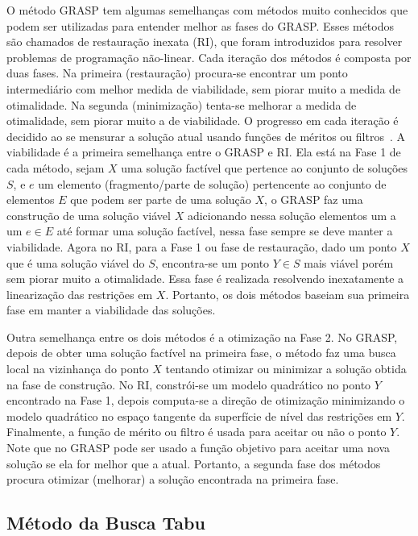 O método GRASP tem algumas semelhanças com métodos muito conhecidos que podem ser utilizadas para entender melhor as fases do GRASP. Esses métodos são chamados de restauração inexata (RI), que foram introduzidos para resolver problemas de programação não-linear. Cada iteração dos métodos é composta por duas fases. Na primeira (restauração) procura-se encontrar um ponto intermediário com melhor medida de viabilidade, sem piorar muito a medida de otimalidade. Na segunda (minimização) tenta-se melhorar a medida de otimalidade, sem piorar muito a de viabilidade. O progresso em cada iteração é decidido ao se mensurar a solução atual usando funções de méritos ou filtros~\citep{martinez2000inexact}. A viabilidade é a primeira semelhança entre o GRASP e RI. Ela está na Fase 1 de cada método, sejam $X$ uma solução factível que pertence ao conjunto de soluções $S$, e $e$ um elemento (fragmento/parte de solução) pertencente ao conjunto de elementos $E$ que podem ser parte de uma solução $X$, o GRASP faz uma construção de uma solução viável $X$ adicionando nessa solução elementos um a um $e \in E$ até formar uma solução factível, nessa fase sempre se deve manter a viabilidade. Agora no RI, para a Fase 1 ou fase de restauração, dado um ponto $X$ que é uma solução viável do $S$, encontra-se um ponto $Y \in S$ mais viável porém sem piorar muito a otimalidade. Essa fase é realizada resolvendo inexatamente a linearização das restrições em $X$. Portanto, os dois métodos baseiam sua primeira fase em manter a viabilidade das soluções. 

Outra semelhança entre os dois métodos é a otimização na Fase 2. No GRASP, depois de obter uma solução factível na primeira fase, o método faz uma busca local na vizinhança do ponto $X$ tentando otimizar ou minimizar a solução obtida na fase de construção. No RI, constrói-se um modelo quadrático no ponto $Y$ encontrado na Fase 1, depois computa-se a direção de otimização minimizando o modelo quadrático no espaço tangente da superfície de nível das restrições em $Y$. Finalmente, a função de mérito ou filtro é usada para aceitar ou não o ponto $Y$. Note que no GRASP pode ser usado a função objetivo para aceitar uma nova solução se ela for melhor que a atual. Portanto, a segunda fase dos métodos procura otimizar (melhorar) a solução encontrada na primeira fase. 

\subsection{Método da Busca Tabu}


